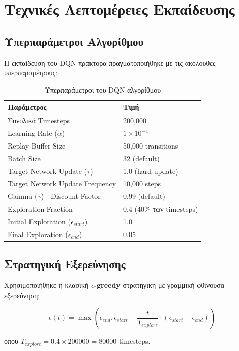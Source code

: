 \documentclass[11pt, a4paper]{article}
\begin{document}
\section{Τεχνικές Λεπτομέρειες Εκπαίδευσης}

\subsection{Υπερπαράμετροι Αλγορίθμου}
Η εκπαίδευση του DQN πράκτορα πραγματοποιήθηκε με τις ακόλουθες υπερπαραμέτρους:

\begin{table}[H]
\centering
\begin{tabular}{@{}ll@{}}
\toprule
\textbf{Παράμετρος} & \textbf{Τιμή} \\ \midrule
Συνολικά Timesteps & 200,000 \\
Learning Rate ($\alpha$) & $1 \times 10^{-4}$ \\
Replay Buffer Size & 50,000 transitions \\
Batch Size & 32 (default) \\
Target Network Update ($\tau$) & 1.0 (hard update) \\
Target Network Update Frequency & 10,000 steps \\
Gamma ($\gamma$) - Discount Factor & 0.99 (default) \\
Exploration Fraction & 0.4 (40\% των timesteps) \\
Initial Exploration ($\epsilon_{start}$) & 1.0 \\
Final Exploration ($\epsilon_{end}$) & 0.05 \\
\bottomrule
\end{tabular}
\caption{Υπερπαράμετροι του DQN αλγορίθμου}
\label{tab:hyperparameters}
\end{table}

\subsection{Στρατηγική Εξερεύνησης}
Χρησιμοποιήθηκε η κλασική \textbf{$\epsilon$-greedy} στρατηγική με γραμμική φθίνουσα εξερεύνηση:

\begin{equation}
\epsilon(t) = \max\left(\epsilon_{end}, \epsilon_{start} - \frac{t}{T_{explore}} \cdot (\epsilon_{start} - \epsilon_{end})\right)
\end{equation}

όπου $T_{explore} = 0.4 \times 200000 = 80000$ timesteps.
\end{document}
